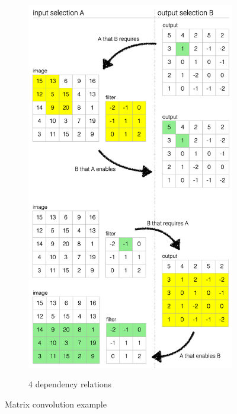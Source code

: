 \begin{figure}
   \begin{subfigure}{\textwidth}
      {\includegraphics[scale=0.4]{fig/example/4-relations.png}}
      \caption{4 dependency relations}
   \end{subfigure}
   \begin{subfigure}{0.48\textwidth}
      \small
      
   \end{subfigure}
   \begin{subfigure}{0.48\textwidth}
      \small
      
   \end{subfigure}
   \caption{Matrix convolution example}
\end{figure}
